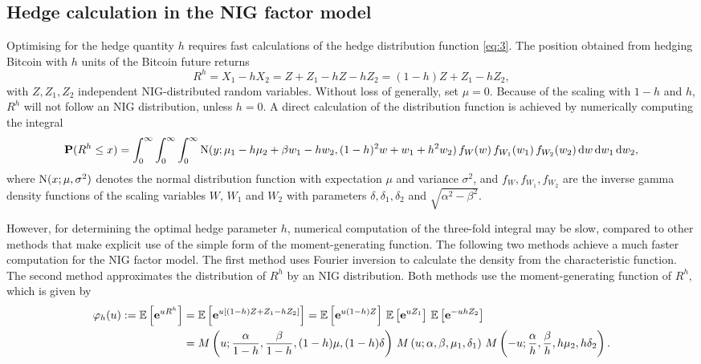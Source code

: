 \subsection{Hedge calculation in the NIG factor model}
\label{sec:hedge-calc-nig}

Optimising for the hedge quantity $h$ requires fast calculations of
the hedge distribution function \eqref{eq:3}. The position obtained
from hedging Bitcoin with $h$ units of the Bitcoin future returns
\begin{equation*}
  R^h = X_1 - h X_2 = Z + Z_1 - h Z - h Z_2 = (1-h) Z + Z_1 - h Z_2,
\end{equation*}
with $Z, Z_1, Z_2$ independent NIG-distributed random
variables. Without loss of generally, set $\mu=0$. Because of the
scaling with $1-h$ and $h$, $R^h$ will not follow an NIG distribution,
unless $h=0$.  A direct calculation of the distribution function is
achieved by numerically computing the integral
\begin{equation*}
  {\bf P}(R^h\leq x) = \int_0^\infty \int_0^\infty \int_0^\infty
  {\rm N}(y; \mu_1 - h \mu_2 + \beta w_1 - h w_2, (1-h)^2 w + w_1 + h^2
  w_2)\, f_W(w)\, f_{W_1}(w_1)\, f_{W_2} (w_2)\, {\rm d} w\, {\rm d} w_1\, {\rm d} w_2,
\end{equation*}
where ${\rm N}(x; \mu, \sigma^2)$ denotes the normal distribution
function with expectation $\mu$ and variance $\sigma^2$, and
$f_W, f_{W_1}, f_{W_2}$ are the inverse gamma density functions of the
scaling variables $W$, $W_1$ and $W_2$ with parameters
$\delta, \delta_1, \delta_2$ and $\sqrt{\alpha^2-\beta^2}$. 

However, for determining the optimal hedge parameter $h$, numerical
computation of the three-fold integral may be slow, compared to other
methods that make explicit use of the simple form of the
moment-generating function.  The following two methods achieve a much
faster computation for the NIG factor model.  The first method uses
Fourier inversion to calculate the density from the characteristic
function. The second method approximates the distribution of $R^h$ by
an NIG distribution.  Both methods use the moment-generating function
of $R^h$, which is given by
\begin{align}
  \varphi_h(u):=\E\left[\e^{u R^h}\right]
  &= \E\left[ \e^{u[(1-h) Z + Z_1 -h Z_2]}\right] %
    = \E\left[ \e^{u(1-h) Z}\right]\, \E\left[ \e^{u Z_1}\right] \,
    \E\left[ \e^{-u h Z_2}\right]\nonumber\\
  &=M\left(u;\frac{\alpha}{1-h}, \frac{\beta}{1-h}, (1-h)\mu,
    (1-h)\delta\right)\,
    M\left(u; \alpha, \beta, \mu_1, \delta_1\right)\,
    M\left(-u; \frac{\alpha}{h}, \frac{\beta}{h}, h\mu_2,
    h\delta_2\right).
    \label{eq:7}
\end{align}


